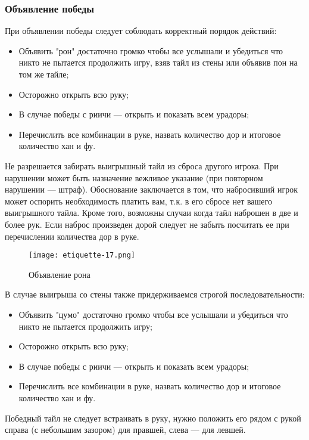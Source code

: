\subsubsection{Объявление победы}

При объявлении победы следует соблюдать корректный порядок действий:

\begin{itemize}
	\item Объявить "рон" достаточно громко чтобы все услышали и убедиться что никто не пытается продолжить игру, взяв тайл из стены или объявив пон на том же тайле;
	\item Осторожно открыть всю руку;
	\item В случае победы с риичи --- открыть и показать всем урадоры;
	\item Перечислить все комбинации в руке, назвать количество дор и итоговое количество хан и фу.
\end{itemize}

Не разрешается забирать выигрышный тайл из сброса другого игрока. При нарушении может быть назначение вежливое указание (при повторном нарушении --- штраф). Обоснование заключается в том, что набросивший игрок может оспорить необходимость платить вам, т.к. в его сбросе нет вашего выигрышного тайла. Кроме того, возможны случаи когда тайл наброшен в две и более рук. Если наброс произведен дорой следует не забыть посчитать ее при перечислении количества дор в руке.

\begin{figure}[H]
	\centering
	\texttt{[image: etiquette-17.png]}
	\caption{Объявление рона}
\end{figure}

В случае выигрыша со стены также придерживаемся строгой последовательности:

\begin{itemize}
	\item Объявить "цумо" достаточно громко чтобы все услышали и убедиться что никто не пытается продолжить игру;
	\item Осторожно открыть всю руку;
	\item В случае победы с риичи --- открыть и показать всем урадоры;
	\item Перечислить все комбинации в руке, назвать количество дор и итоговое количество хан и фу.
\end{itemize}

Победный тайл не следует встраивать в руку, нужно положить его рядом с рукой справа (с небольшим зазором) для правшей, слева --- для левшей. 

